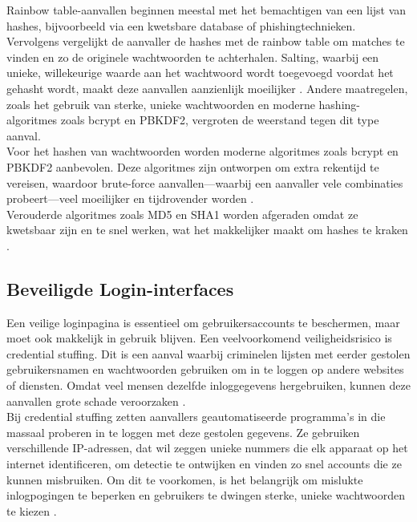 Rainbow table-aanvallen beginnen meestal met het bemachtigen van een lijst van hashes, bijvoorbeeld via een kwetsbare database of phishingtechnieken. Vervolgens vergelijkt de aanvaller de hashes met de rainbow table om matches te vinden en zo de originele wachtwoorden te achterhalen. Salting, waarbij een unieke, willekeurige waarde aan het wachtwoord wordt toegevoegd voordat het gehasht wordt, maakt deze aanvallen aanzienlijk moeilijker \textcite{Sriramya2015}. Andere maatregelen, zoals het gebruik van sterke, unieke wachtwoorden en moderne hashing-algoritmes zoals bcrypt en PBKDF2, vergroten de weerstand tegen dit type aanval.\\

Voor het hashen van wachtwoorden worden moderne algoritmes zoals bcrypt en PBKDF2 aanbevolen. Deze algoritmes zijn ontworpen om extra rekentijd te vereisen, waardoor brute-force aanvallen—waarbij een aanvaller vele combinaties probeert—veel moeilijker en tijdrovender worden \autocite{Sriramya2015}.\\

Verouderde algoritmes zoals MD5 en SHA1 worden afgeraden omdat ze kwetsbaar zijn en te snel werken, wat het makkelijker maakt om hashes te kraken \autocite{Long2019}.

\subsection{Beveiligde Login-interfaces}
Een veilige loginpagina is essentieel om gebruikersaccounts te beschermen, maar moet ook makkelijk in gebruik blijven. Een veelvoorkomend veiligheidsrisico is credential stuffing. Dit is een aanval waarbij criminelen lijsten met eerder gestolen gebruikersnamen en wachtwoorden gebruiken om in te loggen op andere websites of diensten. Omdat veel mensen dezelfde inloggegevens hergebruiken, kunnen deze aanvallen grote schade veroorzaken \autocite{SanderVinberg2021}.\\

Bij credential stuffing zetten aanvallers geautomatiseerde programma’s in die massaal proberen in te loggen met deze gestolen gegevens. Ze gebruiken verschillende IP-adressen, dat wil zeggen unieke nummers die elk apparaat op het internet identificeren, om detectie te ontwijken en vinden zo snel accounts die ze kunnen misbruiken. Om dit te voorkomen, is het belangrijk om mislukte inlogpogingen te beperken en gebruikers te dwingen sterke, unieke wachtwoorden te kiezen \autocite{SanderVinberg2021}.\\

